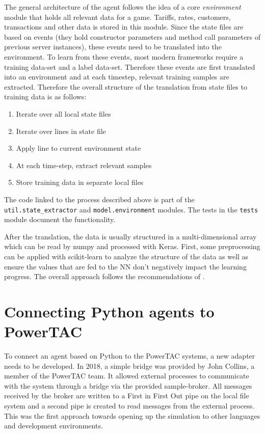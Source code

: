 The general architecture of the agent follows the idea of a core \emph{environment} module that holds all relevant data
for a game. Tariffs, rates, customers, transactions and other data is stored in this module. Since the state files are
based on events (they hold constructor parameters and method call parameters of previous server instances), these events
need to be translated into the environment. To learn from these events, most modern frameworks require a training
data-set and a label data-set. Therefore these events are first translated into an environment and at each timestep,
relevant training samples are extracted. Therefore the overall structure of the translation from state files to training
data is as follows:

\begin{enumerate} \item Iterate over all local state files \item Iterate over lines in state file \item Apply line to
    current environment state \item At each time-step, extract relevant samples \item Store training data in separate local
files \end{enumerate}

The code linked to the process described above is part of the \texttt{util.state\_extractor} and
\texttt{model.environment} modules. The tests in the \texttt{tests} module document the functionality.

After the translation, the data is usually structured in a multi-dimensional array which can be read by numpy and
processed with Keras. First, some preprocessing can be applied with scikit-learn to analyze the structure of the data as
well as ensure the values that are fed to the \ac {NN} don't negatively impact the learning progress. The overall
approach follows the recommendations of \citep{Goodfellow-et-al-2016}.


\section{Connecting Python agents to PowerTAC}%
\label{sec:connecting_python_agents_to_powertac}



To connect an agent based on Python to the \ac{PowerTAC} systems, a new adapter needs to be developed. In 2018, a simple
bridge was provided by John Collins, a member of the \ac {PowerTAC} team. It allowed external processes to communicate with the system through a bridge via the
provided sample-broker. All messages received by the broker are written to a First in First Out pipe on the local file
system and a second pipe is created to read messages from the external process. This was the first approach towards
opening up the simulation to other languages and development environments.

